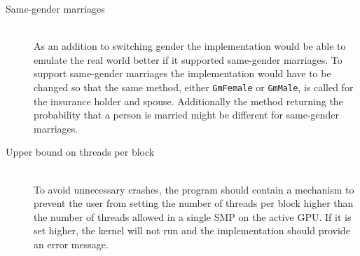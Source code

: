 \begin{description}
\item[Same-gender marriages] \hfill \\
As an addition to switching gender the implementation would be able to emulate the real world better if it supported same-gender marriages. 
To support same-gender marriages the implementation would have to be changed so that the same method, either \texttt{GmFemale} or \texttt{GmMale}, is called for the insurance holder and spouse. Additionally the method returning the probability that a person is married might be different for same-gender marriages. \\

\item[Upper bound on threads per block] \hfill \\
To avoid unnecessary crashes, the program should contain a mechanism to prevent the user from setting the number of threads per block higher than the number of threads allowed in a single SMP on the active GPU. If it is set higher, the kernel will not run and the implementation should provide an error message.
\end{description}
